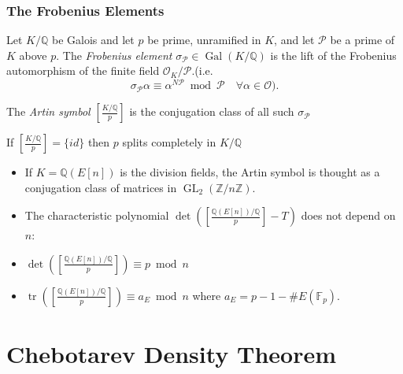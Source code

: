\documentclass[10pt,final]{beamer} %
\newcommand{\Q}{\mathbb Q}
\newcommand{\Z}{\mathbb Z}
\newcommand{\F}{\mathbb F}
\theoremstyle{definition}
\begin{document}
\begin{frame}
\frametitle{The Frobenius Elements}

\begin{Definition}
Let $K/\Q$ be Galois and let $p$ be prime, unramified in $K$, and let $\mathcal{P}$ be a prime of $K$ above $p$. 
The \emph{Frobenius element} $\sigma_\mathcal{P}\in\operatorname{Gal}(K/\Q)$ is the lift of the Frobenius automorphism of the finite field 
$\mathcal O_K/\mathcal P$.\pause (i.e. 
$$\sigma_\mathcal{P}\alpha\equiv \alpha^{N\mathcal{P}}\bmod \mathcal P\quad \forall \alpha\in\mathcal{O}).$$\pause

The \emph{Artin symbol}  $\left[\frac{K/\Q}p\right]$ is the conjugation class of all such $\sigma_\mathcal{P}$
\end{Definition}\pause

If $\left[\frac{K/\Q}p\right]=\{id\}$ then $p$ splits completely in $K/\Q$\pause

\begin{itemize}[<+-| alert@+>]
 \item If  $K=\Q(E[n])$ is the division fields, 
the Artin symbol is thought as a conjugation class of matrices in $\operatorname{GL}_2(\Z/n\Z)$.
\item The characteristic polynomial 
$\det(\left[\frac{\Q(E[n])/\Q}p\right]-T)$
does not depend on $n$:
\item{} $\det\left(\left[\frac{\Q(E[n])/\Q}p\right]\right)\equiv p\bmod n$
\item{} $\operatorname{tr}\left(\left[\frac{\Q(E[n])/\Q}p\right]\right)\equiv a_E\bmod n$
where $a_E=p-1-\#E(\F_p)$.
\end{itemize}
\end{frame}

\section{Chebotarev Density Theorem}
\end{document}
